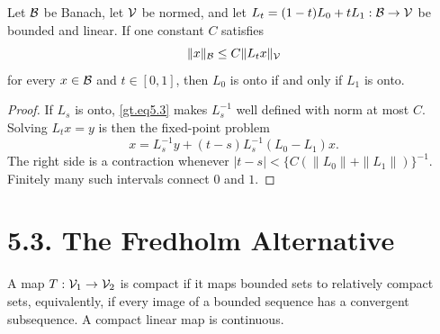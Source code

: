 \begin{theorem}\label{gt.thm5.2}

Let $\mathcal{B}$ be Banach, let $\mathcal{V}$ be normed, and let
$L_t=(1-t)L_0+tL_1:\mathcal{B}\to\mathcal{V}$ be bounded and linear. If one constant $C$
satisfies
\begin{equation}\label{gt.eq5.3}
\|x\|_{\mathcal{B}}\leq C\|L_tx\|_{\mathcal{V}}
\end{equation}
for every $x\in\mathcal{B}$ and $t\in[0,1]$, then $L_0$ is onto if and only if
$L_1$ is onto.
\end{theorem}
\begin{proof}
\sketch If $L_s$ is onto, \eqref{gt.eq5.3} makes $L_s^{-1}$ well defined
with norm at most $C$. Solving $L_tx=y$ is then the fixed-point problem
\[
x=L_s^{-1}y+(t-s)L_s^{-1}(L_0-L_1)x.
\]
The right side is a contraction whenever
$|t-s|<\{C(\|L_0\|+\|L_1\|)\}^{-1}$. Finitely many such intervals connect
$0$ and $1$.
\end{proof}

\section*{5.3. The Fredholm Alternative}

\begin{definition}\label{gt.def5.3.compact-mapping}

A map $T:\mathcal{V}_1\to\mathcal{V}_2$ is compact if it maps bounded sets to relatively
compact sets, equivalently, if every image of a bounded sequence has a
convergent subsequence. A compact linear map is continuous.
\end{definition}

